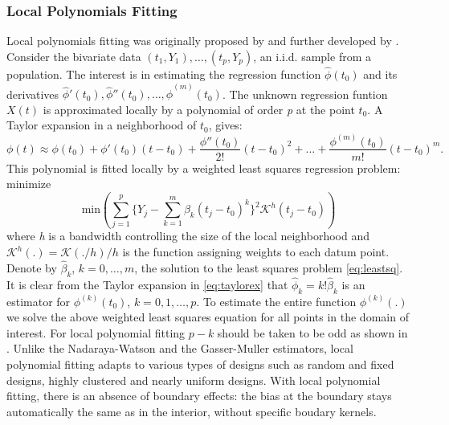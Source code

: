\subsubsection*{Local Polynomials Fitting}
Local polynomials fitting was originally proposed by \cite{Clev:1979} and further developed by \cite{Fan:Gijb:1995}. Consider the bivariate data $(t_{1},Y_{1}),\dots,(t_{p},Y_{p})$, an i.i.d. sample from a population. The interest is in estimating the regression function $\hat{\phi}(t_{0})$ and its derivatives $\hat{\phi}'(t_{0}),\hat{\phi}''(t_{0}),\dots,\hat{\phi}^{(m)}(t_{0})$. 
The unknown regression funtion $X(t)$ is approximated locally by a polynomial of order \textit{p} at the point $t_{0}$. A Taylor expansion in a neighborhood of $t_{0}$, gives:
\begin{equation}\label{eq:taylorex}
\phi(t) \approx \phi(t_{0}) + \phi'(t_{0})(t-t_{0}) + \frac{\phi''(t_{0})}{2!}(t-t_{0})^{2}+\dots+\frac{\phi^{(m)}(t_{0})}{m!}(t-t_{0})^{m}.
\end{equation}
This polynomial is fitted locally by a weighted least squares regression problem: minimize
\begin{equation}\label{eq:leastsq}
\text{min}\left(\sum\limits_{j=1}^{p}\{Y_{j}-\sum\limits_{k=1}^{m}\beta_{k}\left(t_{j}-t_{0}\right)^{k}\}^{2}\mathcal{K}^{h}(t_{j}-t_{0})\right)
\end{equation}
where \textit{h} is a bandwidth controlling the size of the local neighborhood and $\mathcal{K}^{h}(.) = \mathcal{K}(./h)/h$ is the function assigning weights to each datum point. Denote by $\hat{\beta}_{k}$, $k=0,\dots,m$, the solution to the least squares problem \eqref{eq:leastsq}. \\
It is clear from the Taylor expansion in \eqref{eq:taylorex} that $\hat{\phi}_{k}=k!\hat{\beta}_{k}$ is an estimator for $\phi^{(k)}(t_{0})$, $k=0,1,\dots,p$. To estimate the entire function $\phi^{(k)}(.)$ we solve the above weighted least squares equation for all points in the domain of interest. For local polynomial fitting $p-k$ should be taken to be odd as shown in \citep{Rupp:Wand:1994,Fan:Gijb:1995}. Unlike the Nadaraya-Watson and the Gasser-Muller estimators, local polynomial fitting adapts to various types of designs such as random and fixed designs, highly clustered and nearly uniform designs. With local polynomial fitting, there is an absence of boundary effects: the bias at the boundary stays automatically the same as in the interior, without specific boudary kernels.



